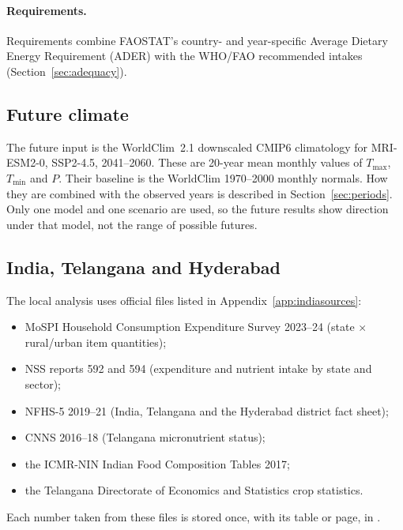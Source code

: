 \paragraph{Requirements.} Requirements combine FAOSTAT's country- and year-specific Average Dietary Energy
Requirement (ADER) with the WHO/FAO recommended intakes (Section~\ref{sec:adequacy}).



\subsection{Future climate}
The future input is the WorldClim~2.1 downscaled CMIP6 climatology for MRI-ESM2-0, SSP2-4.5, 2041--2060. These are
20-year mean monthly values of $T_{\max}$, $T_{\min}$ and $P$. Their baseline is the WorldClim 1970--2000 monthly
normals. How they are combined with the observed years is described in Section~\ref{sec:periods}. Only one model
and one scenario are used, so the future results show direction under that model, not the range of possible
futures.

\subsection{India, Telangana and Hyderabad}
The local analysis uses official files listed in Appendix~\ref{app:indiasources}:
\begin{itemize}
\item MoSPI Household Consumption Expenditure Survey 2023--24 (state $\times$ rural/urban item quantities);
\item NSS reports 592 and 594 (expenditure and nutrient intake by state and sector);
\item NFHS-5 2019--21 (India, Telangana and the Hyderabad district fact sheet);
\item CNNS 2016--18 (Telangana micronutrient status);
\item the ICMR-NIN Indian Food Composition Tables 2017;
\item the Telangana Directorate of Economics and Statistics crop statistics.
\end{itemize}
Each number taken from these files is stored once, with its table or page, in
.
